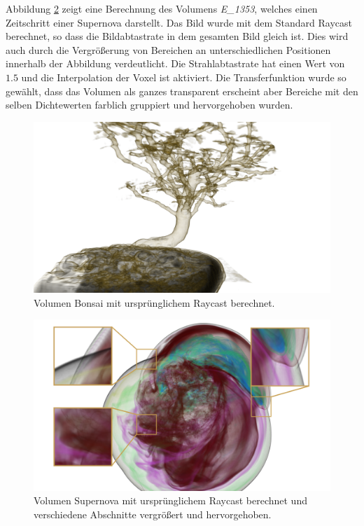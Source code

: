 Abbildung \ref{fig::res::sup_st} zeigt eine Berechnung des Volumens \emph{E\_1353}, welches einen Zeitschritt einer Supernova darstellt.
Das Bild wurde mit dem Standard Raycast berechnet, so dass die Bildabtastrate in dem gesamten Bild gleich ist.
Dies wird auch durch die Vergrößerung von Bereichen an unterschiedlichen Positionen innerhalb der Abbildung verdeutlicht.
Die Strahlabtastrate hat einen Wert von $1.5$ und die Interpolation der Voxel ist aktiviert.
Die Transferfunktion wurde so gewählt, dass das Volumen als ganzes transparent erscheint aber Bereiche mit den selben Dichtewerten farblich gruppiert und hervorgehoben wurden.

\begin{landscape}
	\begin{figure}
		\centering
		\includegraphics[width=\textheight]{../../Grafiken/results/picture_quality/bonsai/Standard_img-1_Ray-1-5.png}
		\caption{Volumen Bonsai mit ursprünglichem Raycast berechnet.}
		\label{fig::res::bon_st}
	\end{figure}
\end{landscape}

\begin{landscape}
	\begin{figure}
		\centering
		\includegraphics[width=\textheight]{../../Grafiken/results/picture_quality/supernova/Standard_img-1_Ray-1-5_edited.png}
		\caption{Volumen Supernova mit ursprünglichem Raycast berechnet und verschiedene Abschnitte vergrößert und hervorgehoben.}
		\label{fig::res::sup_st}
	\end{figure}
\end{landscape}

